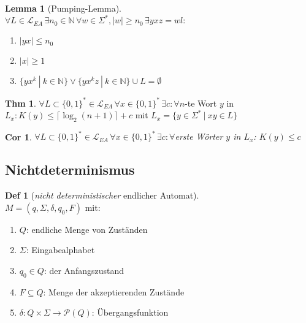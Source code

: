 \documentclass[a4paper, 10pt]{article}
\newtheorem*{corollary}{Cor}
\theoremstyle{definition}
\newtheorem{definition}{Def}[section]
\newtheorem{lemma}{Lemma}[section]
\newtheorem{theorem}{Thm}[section]
\newcommand{\N}{\mathbb{N}}
\newcommand{\words}{\Sigma^*}
\newcommand{\A}{\Sigma}
\begin{document}
\begin{lemma}[Pumping-Lemma] \ \\ 
    \(\forall L \in \mathcal{L}_{EA} \, \exists n_0 \in \N \, \forall w \in \words, |w| \geq n_0 \, \exists yxz = wl:\)
    \begin{enumerate}
        \item \(|yx| \leq n_0\)
        \item \(|x| \geq 1\)
        \item \(\{yx^k \ | \ k \in \N\} \lor \{yx^kz \ | \ k \in \N\} \cup L = \emptyset\)
    \end{enumerate}
\end{lemma}

\begin{theorem}
    \(\forall L \subset \{0, 1\}^* \in \mathcal{L}_{EA}\, \forall x \in \{0, 1\}^* \, \exists c : \forall n\)-te Wort \(y\) in \(L_x: K(y) \leq \lceil \log_2(n + 1)\rceil + c\) mit \(L_x = \{y \in \words \ | \ xy \in L\}\)
\end{theorem}

\begin{corollary}
    \(\forall L \subset \{0, 1\}^* \in \mathcal{L}_{EA} \, \forall x \in \{0, 1\}^* \, \exists c: \forall\)erste Wörter \(y\) in \(L_x\): \(K(y) \leq c\)
\end{corollary}

\pagebreak
\subsection*{Nichtdeterminismus}
\begin{definition}[\textit{nicht deterministischer} endlicher Automat] \(\;\) \\
    \(M = (q, \A, \delta, q_0, F)\) mit:
    \begin{enumerate}
        \item \(Q\): endliche Menge von Zuständen
        \item \(\A\): Eingabealphabet
        \item \(q_0 \in Q\): der Anfangszustand
        \item \(F \subseteq Q\): Menge der akzeptierenden Zustände
        \item \(\delta: Q \times \A \to \mathcal{P}(Q)\): Übergangsfunktion
    \end{enumerate}
\end{definition}
\end{document}
